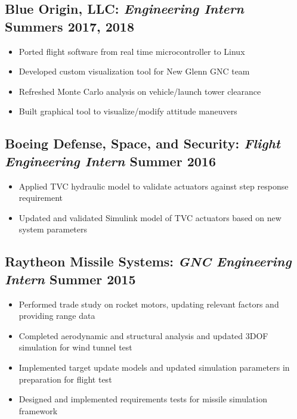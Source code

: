 \documentclass{article}
\begin{document}
\subsection{\textbf{Blue Origin, LLC:} \textit{Engineering Intern} \hfill Summers 2017, 2018}
\begin{itemize}
    \item Ported flight software from real time microcontroller to Linux
    \item Developed custom visualization tool for New Glenn GNC team
    \item Refreshed Monte Carlo analysis on vehicle/launch tower clearance
    \item Built graphical tool to visualize/modify attitude maneuvers
\end{itemize}

\subsection{\textbf{Boeing Defense, Space, and Security:} \textit{Flight Engineering Intern} \hfill Summer 2016}
\begin{itemize}
    \item Applied TVC hydraulic model to validate actuators against step response requirement
    \item Updated and validated Simulink model of TVC actuators based on new system parameters
\end{itemize}

\subsection{\textbf{Raytheon Missile Systems:} \textit{GNC Engineering Intern} \hfill Summer 2015}
\begin{itemize}
    \item Performed trade study on rocket motors, updating relevant factors and providing range data
    \item Completed aerodynamic and structural analysis and updated 3DOF simulation for wind tunnel test
    \item Implemented target update models and updated simulation parameters in preparation for flight test
    \item Designed and implemented requirements tests for missile simulation framework
\end{itemize}
\end{document}

